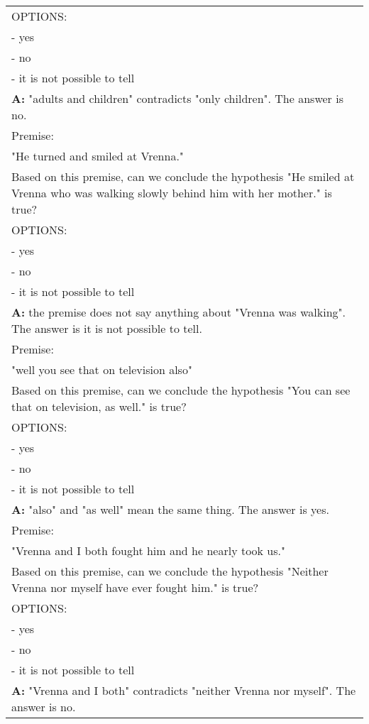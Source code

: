\begin{table}[h]
\begin{tabular}{p{14cm}}
        OPTIONS:\\
        - yes\\
        - no\\
        - it is not possible to tell\\
        \vspace{-1mm}
        \textbf{A:} "adults and children" contradicts "only children". The answer is no.\\
        \vspace{0mm}
        Premise:\\
        "He turned and smiled at Vrenna."\\
        Based on this premise, can we conclude the hypothesis "He smiled at Vrenna who was walking slowly behind him with her mother." is true?\\
        OPTIONS:\\
        - yes\\
        - no\\
        - it is not possible to tell\\
        \vspace{-1mm}
        \textbf{A:} the premise does not say anything about "Vrenna was walking". The answer is it is not possible to tell.\\
        \vspace{0mm}
        Premise:\\
        "well you see that on television also"\\
        Based on this premise, can we conclude the hypothesis "You can see that on television, as well." is true?\\
        OPTIONS:\\
        - yes\\
        - no\\
        - it is not possible to tell\\
        \vspace{-1mm}
        \textbf{A:} "also" and "as well" mean the same thing. The answer is yes.\\
        \vspace{0mm}
        Premise:\\
        "Vrenna and I both fought him and he nearly took us."\\
        Based on this premise, can we conclude the hypothesis "Neither Vrenna nor myself have ever fought him." is true?\\
        OPTIONS:\\
        - yes\\
        - no\\
        - it is not possible to tell\\
        \vspace{-1mm}
        \textbf{A:} "Vrenna and I both" contradicts "neither Vrenna nor myself". The answer is no.\\
        \bottomrule
    \end{tabular}
    \label{tab:prompt-nli}
\end{table}

